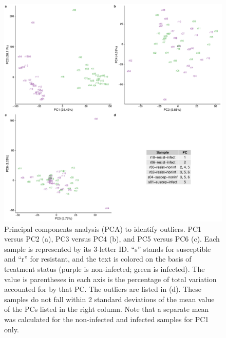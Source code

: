 \documentclass[fleqn,10pt]{wlscirep}
\begin{document}
\begin{figure}[ht]
\centering
\includegraphics[width=\linewidth]{../figure/outliers.pdf}
\caption{
Principal components analysis (PCA) to identify outliers. PC1 versus
PC2 (a), PC3 versus PC4 (b), and PC5 versus PC6 (c). Each sample is
represented by its 3-letter ID. “s” stands for susceptible and “r” for
resistant, and the text is colored on the basis of treatment status
(purple is non-infected; green is infected). The value is parentheses
in each axis is the percentage of total variation accounted for by
that PC. The outliers are listed in (d). These samples do not fall
within 2 standard deviations of the mean value of the PCs listed in
the right column. Note that a separate mean was calculated for the
non-infected and infected samples for PC1 only.
}
\label{fig:outliers}
\end{figure}
\end{document}
